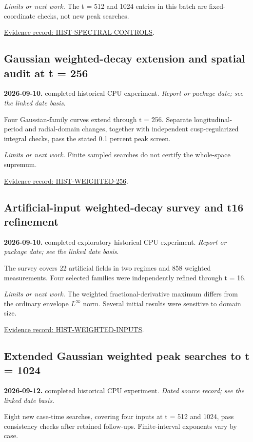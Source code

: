 \documentclass[11pt]{article}
\begin{document}
\noindent\textit{Limits or next work.} The t = 512 and 1024 entries in this batch are fixed-coordinate checks, not new peak searches.

\noindent\href{https://github.com/matasvai/dysthe-paper/blob/codex/research-record-2026-11-05/research-record/2026-11-05/README.md#hist-spectral-controls}{Evidence record: HIST-SPECTRAL-CONTROLS}.
\subsection*{Gaussian weighted-decay extension and spatial audit at t = 256}
\noindent\textbf{2026-09-10.} completed historical CPU experiment. \emph{Report or package date; see the linked date basis}.\par
Four Gaussian-family curves extend through t = 256. Separate longitudinal-period and radial-domain changes, together with independent cusp-regularized integral checks, pass the stated 0.1 percent peak screen.

\noindent\textit{Limits or next work.} Finite sampled searches do not certify the whole-space supremum.

\noindent\href{https://github.com/matasvai/dysthe-paper/blob/codex/research-record-2026-11-05/research-record/2026-11-05/README.md#hist-weighted-256}{Evidence record: HIST-WEIGHTED-256}.
\subsection*{Artificial-input weighted-decay survey and t16 refinement}
\noindent\textbf{2026-09-10.} completed exploratory historical CPU experiment. \emph{Report or package date; see the linked date basis}.\par
The survey covers 22 artificial fields in two regimes and 858 weighted measurements. Four selected families were independently refined through t = 16.

\noindent\textit{Limits or next work.} The weighted fractional-derivative maximum differs from the ordinary envelope $L^\infty$ norm. Several initial results were sensitive to domain size.

\noindent\href{https://github.com/matasvai/dysthe-paper/blob/codex/research-record-2026-11-05/research-record/2026-11-05/README.md#hist-weighted-inputs}{Evidence record: HIST-WEIGHTED-INPUTS}.
\subsection*{Extended Gaussian weighted peak searches to t = 1024}
\noindent\textbf{2026-09-12.} completed historical CPU experiment. \emph{Dated source record; see the linked date basis}.\par
Eight new case-time searches, covering four inputs at t = 512 and 1024, pass consistency checks after retained follow-ups. Finite-interval exponents vary by case.
\end{document}
